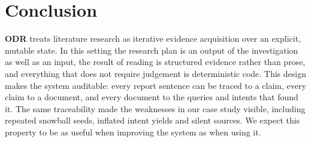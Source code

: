 \documentclass[10pt,a4paper]{article}
\newcommand{\hfont}{\sffamily}
\newcommand{\sys}{{\hfont\bfseries ODR}}
\begin{document}
\section{Conclusion}

\sys{} treats literature research as iterative evidence acquisition over an
explicit, mutable state. In this setting the research plan is an output of
the investigation as well as an input, the result of reading is structured
evidence rather than prose, and everything that does not require judgement
is deterministic code. This design makes the system auditable: every
report sentence can be traced to a claim, every claim to a document, and
every document to the queries and intents that found it. The same
traceability made the weaknesses in our case study visible, including
repeated snowball seeds, inflated intent yields and silent sources. We
expect this property to be as useful when improving the system as when
using it.



\end{document}
